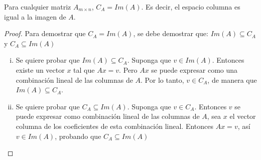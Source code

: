 \begin{theorem}
Para cualquier matriz $A_{m\times n}$, $C_A = Im(A)$. Es decir, el espacio
columna es igual a la imagen de $A$.
\end{theorem}
\begin{proof}
    Para demostrar que $C_A = Im(A)$, se debe demostrar que: $Im(A) \subseteq C_A$ y $C_A \subseteq Im(A)$
    \begin{enumerate}[i.]
        \item Se quiere probar que $Im(A) \subseteq C_A$. Suponga que $v \in Im(A)$. Entonces existe un vector $x$ tal que $Ax = v$. Pero $Ax$ se puede expresar como una combinación lineal de las columnas de $A$. Por lo tanto, $v \in C_A$, de manera que $Im(A) \subseteq C_A$.
        
        \item Se quiere probar que $C_A \subseteq Im(A)$. Suponga que $v \in C_A$. Entonces $v$ se puede expresar como combinación lineal de las columnas de $A$, sea $x$ el vector columna de los coeficientes de esta combinación lineal. Entonces $Ax = v$, así $v \in Im(A)$, probando que $C_A \subseteq Im(A)$
        
    \end{enumerate}
\end{proof}

